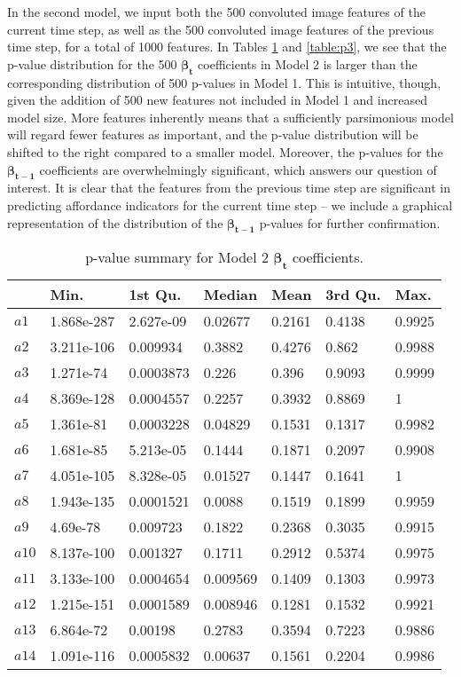 \documentclass[master]{subfiles}
\begin{document}
\vspace{1em}
In the second model, we input both the 500 convoluted image features of the current time step, as well as the 500 convoluted image features of the previous time step, for a total of 1000 features.  In Tables \ref{table:p2} and \ref{table:p3}, we see that the p-value distribution for the 500 $\bm{\beta_t}$ coefficients in Model 2 is larger than the corresponding distribution of 500 p-values in Model 1.  This is intuitive, though, given the addition of 500 new features not included in Model 1 and increased model size.  More features inherently means that a sufficiently parsimonious model will regard fewer features as important, and the p-value distribution will be shifted to the right compared to a smaller model.  Moreover, the p-values for the $\bm{\beta_{t-1}}$ coefficients are overwhelmingly significant, which answers our question of interest.  It is clear that the features from the previous time step are significant in predicting affordance indicators for the current time step -- we include a graphical representation of the distribution of the $\bm{\beta_{t-1}}$ p-values for further confirmation. 
\begin{table}[H]
\vspace{5em}
\centering
\caption{p-value summary for Model 2 $\bm{\beta_t}$ coefficients.}
\begin{tabular}{@{}lllllll@{}}
\toprule
    & Min.       & 1st Qu.   & Median   & Mean   & 3rd Qu. & Max.   \\ \midrule
$a1$  & 1.868e-287 & 2.627e-09 & 0.02677  & 0.2161 & 0.4138  & 0.9925 \\
$a2$  & 3.211e-106 & 0.009934  & 0.3882   & 0.4276 & 0.862   & 0.9988 \\
$a3$  & 1.271e-74  & 0.0003873 & 0.226    & 0.396  & 0.9093  & 0.9999 \\
$a4$  & 8.369e-128 & 0.0004557 & 0.2257   & 0.3932 & 0.8869  & 1      \\
$a5$  & 1.361e-81  & 0.0003228 & 0.04829  & 0.1531 & 0.1317  & 0.9982 \\
$a6$  & 1.681e-85  & 5.213e-05 & 0.1444   & 0.1871 & 0.2097  & 0.9908 \\
$a7$  & 4.051e-105 & 8.328e-05 & 0.01527  & 0.1447 & 0.1641  & 1      \\
$a8$  & 1.943e-135 & 0.0001521 & 0.0088   & 0.1519 & 0.1899  & 0.9959 \\
$a9$  & 4.69e-78   & 0.009723  & 0.1822   & 0.2368 & 0.3035  & 0.9915 \\
$a10$ & 8.137e-100 & 0.001327  & 0.1711   & 0.2912 & 0.5374  & 0.9975 \\
$a11$ & 3.133e-100 & 0.0004654 & 0.009569 & 0.1409 & 0.1303  & 0.9973 \\
$a12$ & 1.215e-151 & 0.0001589 & 0.008946 & 0.1281 & 0.1532  & 0.9921 \\
$a13$ & 6.864e-72  & 0.00198   & 0.2783   & 0.3594 & 0.7223  & 0.9886 \\
$a14$ & 1.091e-116 & 0.0005832 & 0.00637  & 0.1561 & 0.2204  & 0.9986 \\ \bottomrule
\end{tabular}
\label{table:p2}
\end{table}
\end{document}
